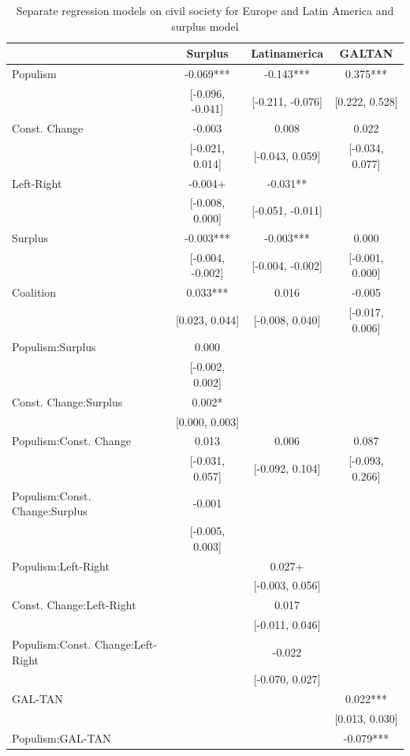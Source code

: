 \documentclass[
  abstract]{article}
\begin{document}
\hypertarget{tbl-cspart_sep}{}
\begin{table}
\caption{\label{tbl-cspart_sep}Separate regression models on civil society for Europe and Latin America
and surplus model }\tabularnewline

\centering\centering\centering
\begin{tabular}[t]{lccc}
\toprule
  & Surplus & Latinamerica & GALTAN\\
\midrule
Populism & -0.069*** & -0.143*** & 0.375***\\
 & {}[-0.096, -0.041] & {}[-0.211, -0.076] & {}[0.222, 0.528]\\
Const. Change & -0.003 & 0.008 & 0.022\\
 & {}[-0.021, 0.014] & {}[-0.043, 0.059] & {}[-0.034, 0.077]\\
Left-Right & -0.004+ & -0.031** & \\
 & {}[-0.008, 0.000] & {}[-0.051, -0.011] & \\
Surplus & -0.003*** & -0.003*** & 0.000\\
 & {}[-0.004, -0.002] & {}[-0.004, -0.002] & {}[-0.001, 0.000]\\
Coalition & 0.033*** & 0.016 & -0.005\\
 & {}[0.023, 0.044] & {}[-0.008, 0.040] & {}[-0.017, 0.006]\\
Populism:Surplus & 0.000 &  & \\
 & {}[-0.002, 0.002] &  & \\
Const. Change:Surplus & 0.002* &  & \\
 & {}[0.000, 0.003] &  & \\
Populism:Const. Change & 0.013 & 0.006 & 0.087\\
 & {}[-0.031, 0.057] & {}[-0.092, 0.104] & {}[-0.093, 0.266]\\
Populism:Const. Change:Surplus & -0.001 &  & \\
 & {}[-0.005, 0.003] &  & \\
Populism:Left-Right &  & 0.027+ & \\
 &  & {}[-0.003, 0.056] & \\
Const. Change:Left-Right &  & 0.017 & \\
 &  & {}[-0.011, 0.046] & \\
Populism:Const. Change:Left-Right &  & -0.022 & \\
 &  & {}[-0.070, 0.027] & \\
GAL-TAN &  &  & 0.022***\\
 &  &  & {}[0.013, 0.030]\\
Populism:GAL-TAN &  &  & -0.079***\\

\end{tabular}
\end{table}
\end{document}
